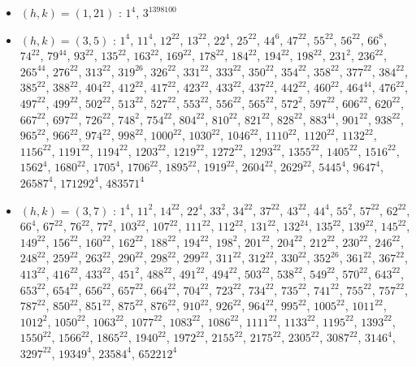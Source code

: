 \begin{itemize}
\item $(h,k)=(1,21)$ : $1^{4}$, $3^{1398100}$
\item $(h,k)=(3,5)$ : $1^{4}$, $11^{4}$, $12^{22}$, $13^{22}$, $22^{4}$, $25^{22}$, $44^{6}$, $47^{22}$, $55^{22}$, $56^{22}$, $66^{8}$, $74^{22}$, $79^{44}$, $93^{22}$, $135^{22}$, $163^{22}$, $169^{22}$, $178^{22}$, $184^{22}$, $194^{22}$, $198^{22}$, $231^{2}$, $236^{22}$, $265^{44}$, $276^{22}$, $313^{22}$, $319^{26}$, $326^{22}$, $331^{22}$, $333^{22}$, $350^{22}$, $354^{22}$, $358^{22}$, $377^{22}$, $384^{22}$, $385^{22}$, $388^{22}$, $404^{22}$, $412^{22}$, $417^{22}$, $423^{22}$, $433^{22}$, $437^{22}$, $442^{22}$, $460^{22}$, $464^{44}$, $476^{22}$, $497^{22}$, $499^{22}$, $502^{22}$, $513^{22}$, $527^{22}$, $553^{22}$, $556^{22}$, $565^{22}$, $572^{2}$, $597^{22}$, $606^{22}$, $620^{22}$, $667^{22}$, $697^{22}$, $726^{22}$, $748^{2}$, $754^{22}$, $804^{22}$, $810^{22}$, $821^{22}$, $828^{22}$, $883^{44}$, $901^{22}$, $938^{22}$, $965^{22}$, $966^{22}$, $974^{22}$, $998^{22}$, $1000^{22}$, $1030^{22}$, $1046^{22}$, $1110^{22}$, $1120^{22}$, $1132^{22}$, $1156^{22}$, $1191^{22}$, $1194^{22}$, $1203^{22}$, $1219^{22}$, $1272^{22}$, $1293^{22}$, $1355^{22}$, $1405^{22}$, $1516^{22}$, $1562^{4}$, $1680^{22}$, $1705^{4}$, $1706^{22}$, $1895^{22}$, $1919^{22}$, $2604^{22}$, $2629^{22}$, $5445^{4}$, $9647^{4}$, $26587^{4}$, $171292^{4}$, $483571^{4}$
\item $(h,k)=(3,7)$ : $1^{4}$, $11^{2}$, $14^{22}$, $22^{4}$, $33^{2}$, $34^{22}$, $37^{22}$, $43^{22}$, $44^{4}$, $55^{2}$, $57^{22}$, $62^{22}$, $66^{4}$, $67^{22}$, $76^{22}$, $77^{2}$, $103^{22}$, $107^{22}$, $111^{22}$, $112^{22}$, $131^{22}$, $132^{24}$, $135^{22}$, $139^{22}$, $145^{22}$, $149^{22}$, $156^{22}$, $160^{22}$, $162^{22}$, $188^{22}$, $194^{22}$, $198^{2}$, $201^{22}$, $204^{22}$, $212^{22}$, $230^{22}$, $246^{22}$, $248^{22}$, $259^{22}$, $263^{22}$, $290^{22}$, $298^{22}$, $299^{22}$, $311^{22}$, $312^{22}$, $330^{22}$, $352^{26}$, $361^{22}$, $367^{22}$, $413^{22}$, $416^{22}$, $433^{22}$, $451^{2}$, $488^{22}$, $491^{22}$, $494^{22}$, $503^{22}$, $538^{22}$, $549^{22}$, $570^{22}$, $643^{22}$, $653^{22}$, $654^{22}$, $656^{22}$, $657^{22}$, $664^{22}$, $704^{22}$, $723^{22}$, $734^{22}$, $735^{22}$, $741^{22}$, $755^{22}$, $757^{22}$, $787^{22}$, $850^{22}$, $851^{22}$, $875^{22}$, $876^{22}$, $910^{22}$, $926^{22}$, $964^{22}$, $995^{22}$, $1005^{22}$, $1011^{22}$, $1012^{2}$, $1050^{22}$, $1063^{22}$, $1077^{22}$, $1083^{22}$, $1086^{22}$, $1111^{22}$, $1133^{22}$, $1195^{22}$, $1393^{22}$, $1550^{22}$, $1566^{22}$, $1865^{22}$, $1940^{22}$, $1972^{22}$, $2155^{22}$, $2175^{22}$, $2305^{22}$, $3087^{22}$, $3146^{4}$, $3297^{22}$, $19349^{4}$, $23584^{4}$, $652212^{4}$

\end{itemize}
